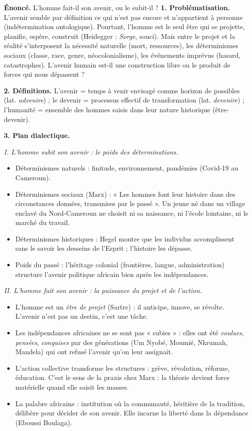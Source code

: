 \documentclass[11pt]{article}
\newcommand{\cle}[1]{{\popxbold\color{popdark}#1}}
\begin{document}
\begin{exoresolu}
\textbf{Énoncé.} L'homme fait-il son avenir, ou le subit-il ?
\tcblower
\textbf{1. Problématisation.} L'avenir semble par définition ce qui n'est pas encore et n'appartient à personne (indétermination ontologique). Pourtant, l'homme est le seul être qui se projette, planifie, espère, construit (Heidegger : \emph{Sorge}, souci). Mais entre le projet et la réalité s'interposent la nécessité naturelle (mort, ressources), les déterminismes sociaux (classe, race, genre, néocolonialisme), les événements imprévus (hasard, catastrophes). L'avenir humain est-il une construction libre ou le produit de forces qui nous dépassent ?

\textbf{2. Définitions.} L'\cle{avenir} = temps à venir envisagé comme horizon de possibles (lat. \emph{advenire}) ; le \cle{devenir} = processus effectif de transformation (lat. \emph{devenire}) ; l'\cle{humanité} = ensemble des hommes saisis dans leur nature historique (être-devenir).

\textbf{3. Plan dialectique.}

\emph{I. L'homme subit son avenir : le poids des déterminations.}
\begin{itemize}
\item Déterminismes naturels : finitude, environnement, pandémies (Covid-19 au Cameroun).
\item Déterminismes sociaux (Marx) : « Les hommes font leur histoire dans des circonstances données, transmises par le passé ». Un jeune né dans un village enclavé du Nord-Cameroun ne choisit ni sa naissance, ni l'école lointaine, ni le marché du travail.
\item Déterminismes historiques : Hegel montre que les individus accomplissent sans le savoir les desseins de l'Esprit ; l'histoire les dépasse.
\item Poids du passé : l'héritage colonial (frontières, langue, administration) structure l'avenir politique africain bien après les indépendances.
\end{itemize}

\emph{II. L'homme fait son avenir : la puissance du projet et de l'action.}
\begin{itemize}
\item L'homme est un \emph{être de projet} (Sartre) : il anticipe, innove, se révolte. L'avenir n'est pas un destin, c'est une \cle{tâche}.
\item Les indépendances africaines ne se sont pas « subies » : elles ont été \emph{voulues}, \emph{pensées}, \emph{conquises} par des générations (Um Nyobé, Moumié, Nkrumah, Mandela) qui ont refusé l'avenir qu'on leur assignait.
\item L'action collective transforme les structures : grève, révolution, réforme, éducation. C'est le sens de la \cle{praxis} chez Marx : la théorie devient force matérielle quand elle saisit les masses.
\item La \cle{palabre} africaine : institution où la communauté, héritière de la tradition, délibère pour décider de son avenir. Elle incarne la liberté dans la dépendance (Eboussi Boulaga).
\end{itemize}


\end{exoresolu}
\end{document}
